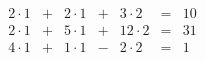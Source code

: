 \documentclass[11pt]{article}
\begin{document}
\[
\begin{array}{lclcrcrr}
2 \cdot 1 & + & 2 \cdot 1 & + &  3 \cdot 2 & = & 10 \\
2 \cdot 1 & + & 5 \cdot 1 & + & 12 \cdot 2 & = & 31 & \\ %
4 \cdot 1 & + & 1 \cdot 1 & - &  2 \cdot 2 & = &  1
\end{array}
\]
\end{document}
